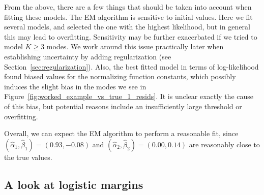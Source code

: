 \documentclass[11pt,twoside,openany]{book}
\numberwithin{Theorem}{chapter}
\numberwithin{Definition}{chapter}
\numberwithin{Lemma}{chapter}
\numberwithin{Algorithm}{chapter}
\numberwithin{equation}{chapter}
\begin{document}
From the above, there are a few things that should be taken into account when
fitting these models. The EM algorithm is sensitive to initial values. Here we
fit several models, and selected the one with the highest likelihood, but in
general this may lead to overfitting. Sensitivity may be further exacerbated if
we tried to model $K \geq 3$ modes. We work around this issue
practically later when establishing uncertainty by adding regularization
(see Section~\ref{sec:regularization}).
Also, the best fitted model in terms of log-likelihood found biased values for
the normalizing function constants, which possibly induces the slight bias in
the modes we see in Figure~\ref{fig:worked_example_vs_true_1_resids}. It is
unclear exactly the cause of this bias, but potential reasons include an
insufficiently large threshold or overfitting.

Overall, we can expect the EM algorithm to perform a reasonable fit,
since $(\hat\alpha_1,\hat\beta_1)=(0.93,-0.08)$ and
$(\hat\alpha_2,\hat\beta_2)=(0.00,0.14)$  are reasonably close to the
true values.

\FloatBarrier
\subsection{A look at  logistic margins}
\end{document}
